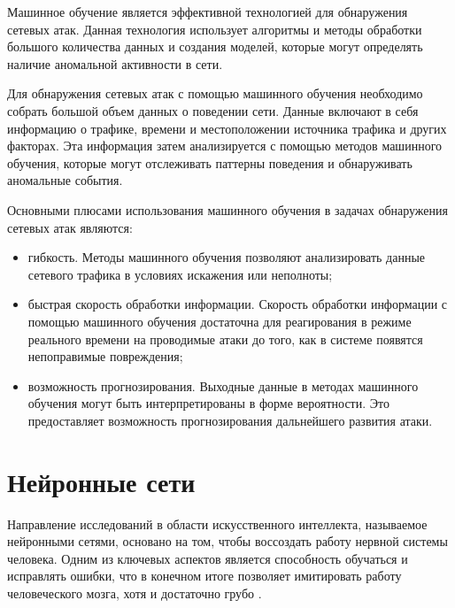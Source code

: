 Машинное обучение является эффективной технологией для обнаружения сетевых атак. Данная технология использует алгоритмы и методы обработки большого количества данных и создания моделей, которые могут определять наличие аномальной активности в сети.

Для обнаружения сетевых атак с помощью машинного обучения необходимо собрать большой объем данных о поведении сети. 
Данные включают в себя информацию о трафике, времени и местоположении источника трафика и других факторах. 
Эта информация затем анализируется с помощью методов машинного обучения, которые могут отслеживать паттерны поведения и обнаруживать аномальные события.


Основными плюсами использования машинного обучения в задачах обнаружения
сетевых атак являются:

\begin{itemize}
    \item гибкость. Методы машинного обучения позволяют анализировать данные сетевого трафика в условиях искажения или неполноты;
    \item быстрая скорость обработки информации. Скорость обработки информации с помощью машинного обучения достаточна для реагирования в режиме реального времени на проводимые атаки до того, как в системе появятся непоправимые повреждения;
    \item возможность прогнозирования. Выходные данные в методах машинного обучения могут быть интерпретированы в форме вероятности. Это предоставляет возможность прогнозирования дальнейшего развития атаки.
\end{itemize}


\section{Нейронные сети}

Направление исследований в области искусственного интеллекта,
называемое нейронными сетями, основано на том, чтобы воссоздать работу нервной системы человека. 
Одним из ключевых аспектов является способность обучаться и исправлять ошибки, что в конечном итоге позволяет 
имитировать работу человеческого мозга, хотя и достаточно грубо \cite{neuralnet}.

